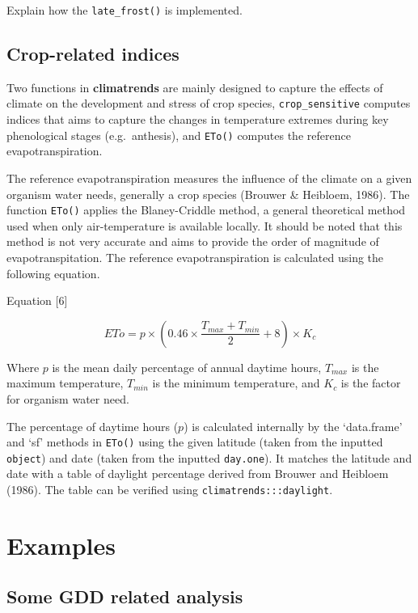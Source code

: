 \documentclass[
]{article}
\begin{document}
Explain how the \texttt{late\_frost()} is implemented.

\hypertarget{crop-related-indices}{%
\subsection{Crop-related indices}\label{crop-related-indices}}

Two functions in \textbf{climatrends} are mainly designed to capture the
effects of climate on the development and stress of crop species,
\texttt{crop\_sensitive} computes indices that aims to capture the
changes in temperature extremes during key phenological stages
(e.g.~anthesis), and \texttt{ETo()} computes the reference
evapotranspiration.

The reference evapotranspiration measures the influence of the climate
on a given organism water needs, generally a crop species (Brouwer \&
Heibloem, 1986). The function \texttt{ETo()} applies the Blaney-Criddle
method, a general theoretical method used when only air-temperature is
available locally. It should be noted that this method is not very
accurate and aims to provide the order of magnitude of
evapotranspitation. The reference evapotranspiration is calculated using
the following equation.

Equation {[}6{]}

\[ETo = p \times \left(0.46 \times \frac{T_{max} + T_{min}}{2} + 8 \right) \times K_c\]

Where \(p\) is the mean daily percentage of annual daytime hours,
\(T_{max}\) is the maximum temperature, \(T_{min}\) is the minimum
temperature, and \(K_c\) is the factor for organism water need.

The percentage of daytime hours (\(p\)) is calculated internally by the
`data.frame' and `sf' methods in \texttt{ETo()} using the given latitude
(taken from the inputted \texttt{object}) and date (taken from the
inputted \texttt{day.one}). It matches the latitude and date with a
table of daylight percentage derived from Brouwer and Heibloem (1986).
The table can be verified using \texttt{climatrends:::daylight}.

\hypertarget{examples}{%
\section{Examples}\label{examples}}

\hypertarget{some-gdd-related-analysis}{%
\subsection{Some GDD related analysis}\label{some-gdd-related-analysis}}
\end{document}
